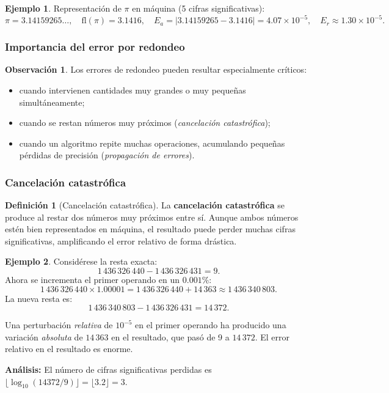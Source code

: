 \documentclass[a4paper,12pt]{article}
\newcommand{\fl}{\mathrm{fl}}
\theoremstyle{definition}
\newtheorem{definicion}{Definición}[section]
\newtheorem{ejemplo}{Ejemplo}[section]
\newtheorem{observacion}{Observación}[section]
\theoremstyle{plain}
\begin{document}
\begin{ejemplo}
Representación de $\pi$ en máquina (5 cifras significativas):
\[
    \pi = 3.14159265\ldots,
    \quad
    \fl(\pi) = 3.1416,
    \quad
    E_a = |3.14159265 - 3.1416| = 4.07 \times 10^{-5},
    \quad
    E_r \approx 1.30 \times 10^{-5}.
\]
\end{ejemplo}

\subsubsection{Importancia del error por redondeo}

\begin{observacion}
Los errores de redondeo pueden resultar especialmente críticos:
\begin{itemize}[leftmargin=1.5em]
    \item cuando intervienen cantidades muy grandes o muy pequeñas
          simultáneamente;
    \item cuando se restan números muy próximos (\emph{cancelación
          catastrófica});
    \item cuando un algoritmo repite muchas operaciones, acumulando pequeñas
          pérdidas de precisión (\emph{propagación de errores}).
\end{itemize}
\end{observacion}

\subsubsection{Cancelación catastrófica}

\begin{definicion}[Cancelación catastrófica]
La \textbf{cancelación catastrófica} se produce al restar dos números muy
próximos entre sí. Aunque ambos números estén bien representados en máquina,
el resultado puede perder muchas cifras significativas, amplificando el error
relativo de forma drástica.
\end{definicion}

\begin{ejemplo}
Considérese la resta exacta:
\[
    1\,436\,326\,440 - 1\,436\,326\,431 = 9.
\]
Ahora se incrementa el primer operando en un $0.001\%$:
\[
    1\,436\,326\,440 \times 1.00001 = 1\,436\,326\,440 + 14\,363
    \approx 1\,436\,340\,803.
\]
La nueva resta es:
\[
    1\,436\,340\,803 - 1\,436\,326\,431 = 14\,372.
\]

Una perturbación \emph{relativa} de $10^{-5}$ en el primer operando ha
producido una variación \emph{absoluta} de $14\,363$ en el resultado, que
pasó de 9 a $14\,372$. El error relativo en el resultado es enorme.

\medskip
\textbf{Análisis:} El número de cifras significativas perdidas es
$\lfloor \log_{10}(14372/9) \rfloor = \lfloor 3.2 \rfloor = 3$.
\end{ejemplo}
\end{document}
